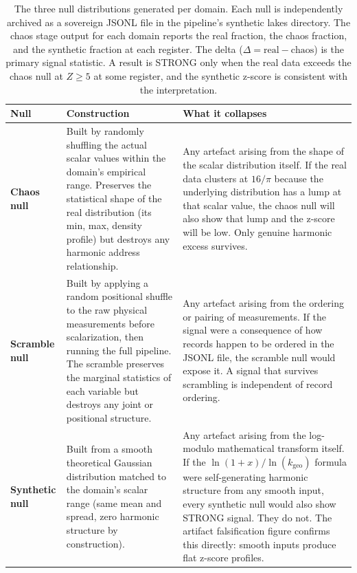 \documentclass[11pt, letterpaper, openany]{book}
\begin{document}
\begin{table}[H]
\centering
\renewcommand{\arraystretch}{1.5}
\small
\begin{tabular}{|l|p{5.5cm}|p{5.5cm}|}
\hline
\rowcolor{kishblue!10}
\textbf{Null} & \textbf{Construction} & \textbf{What it collapses} \\
\hline\hline
\rowcolor{kishblue!5}
\textbf{Chaos null} &
    Built by randomly shuffling the actual scalar values within the domain's
    empirical range. Preserves the statistical shape of the real distribution
    (its min, max, density profile) but destroys any harmonic address
    relationship. &
    Any artefact arising from the shape of the scalar distribution itself.
    If the real data clusters at $16/\pi$ because the underlying distribution
    has a lump at that scalar value, the chaos null will also show that lump
    and the z-score will be low. Only genuine harmonic excess survives. \\
\hline
\rowcolor{goldseal!5}
\textbf{Scramble null} &
    Built by applying a random positional shuffle to the raw physical
    measurements before scalarization, then running the full pipeline.
    The scramble preserves the marginal statistics of each variable but
    destroys any joint or positional structure. &
    Any artefact arising from the ordering or pairing of measurements.
    If the signal were a consequence of how records happen to be ordered
    in the JSONL file, the scramble null would expose it. A signal that
    survives scrambling is independent of record ordering. \\
\hline
\rowcolor{backbonegreen!5}
\textbf{Synthetic null} &
    Built from a smooth theoretical Gaussian distribution matched to the
    domain's scalar range (same mean and spread, zero harmonic structure
    by construction). &
    Any artefact arising from the log-modulo mathematical transform itself.
    If the $\ln(1+x)/\ln(k_\text{geo})$ formula were self-generating harmonic
    structure from any smooth input, every synthetic null would also show
    STRONG signal. They do not. The artifact falsification figure confirms
    this directly: smooth inputs produce flat z-score profiles. \\
\hline
\end{tabular}
\caption{The three null distributions generated per domain. Each null is
independently archived as a sovereign JSONL file in the pipeline's synthetic
lakes directory. The chaos stage output for each domain reports the real
fraction, the chaos fraction, and the synthetic fraction at each register.
The delta ($\Delta = \text{real} - \text{chaos}$) is the primary signal
statistic. A result is STRONG only when the real data exceeds the chaos null
at $Z \geq 5$ at some register, and the synthetic z-score is consistent
with the interpretation.}
\label{tab:three_nulls}
\end{table}
\end{document}
